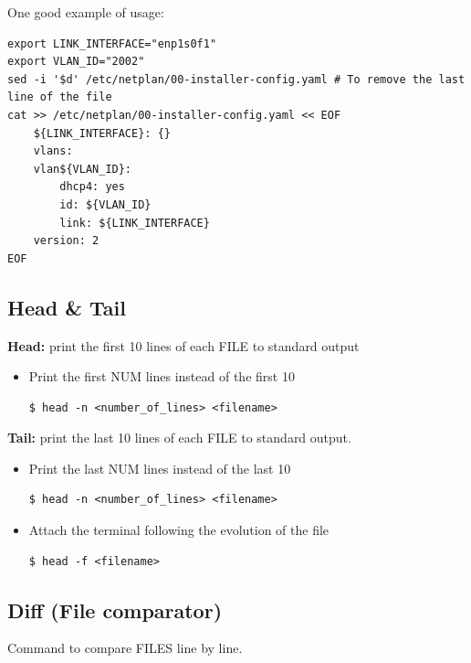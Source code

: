 \documentclass{article}
\newenvironment{codetemplate}[1][]{%
  \mybasecolorbox[#1]
  \itshape
}{%
  \endmybasecolorbox
}
\begin{document}
One good example of usage:
\begin{codetemplate}{}
\begin{verbatim}
export LINK_INTERFACE="enp1s0f1"
export VLAN_ID="2002"
sed -i '$d' /etc/netplan/00-installer-config.yaml # To remove the last line of the file
cat >> /etc/netplan/00-installer-config.yaml << EOF
    ${LINK_INTERFACE}: {}
    vlans:
    vlan${VLAN_ID}:
        dhcp4: yes
        id: ${VLAN_ID}
        link: ${LINK_INTERFACE}
    version: 2
EOF
\end{verbatim}
\end{codetemplate}

\subsection{Head \& Tail}

\textbf{Head:} print the first 10 lines of each FILE to standard output

\begin{itemize}
    \item Print the first NUM lines instead of the first 10
\begin{codetemplate}{}
\begin{verbatim}
$ head -n <number_of_lines> <filename>
\end{verbatim}
\end{codetemplate}
\end{itemize}

\textbf{Tail:}  print the last 10 lines of each FILE to standard output.

\begin{itemize}
    \item Print the last NUM lines instead of the last 10
\begin{codetemplate}{}
\begin{verbatim}
$ head -n <number_of_lines> <filename>
\end{verbatim}
\end{codetemplate}

    \item Attach the terminal following the evolution of the file
\begin{codetemplate}{}
\begin{verbatim}
$ head -f <filename>
\end{verbatim}
\end{codetemplate}
\end{itemize}

\subsection{Diff (File comparator)}
Command to compare FILES line by line.
\end{document}
